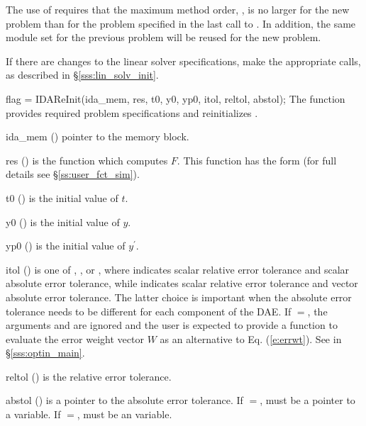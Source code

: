 {The use of  requires that the maximum method order,    
, is no larger for the new problem than for the problem  
specified in the last call to .  In addition, the same
{\nvector} module set for the previous problem
will be reused for the new problem.

If there are changes to the linear solver specifications, make the
appropriate  calls, as described in \S\ref{sss:lin_solv_init}.

{
  flag = IDAReInit(ida\_mem, res, t0, y0, yp0, itol, reltol, abstol);
}
{
  The function  provides required problem specifications 
  and reinitializes {\ida}.
}
{
  \begin{args}
  \item[ida\_mem] ()
    pointer to the {\ida} memory block.
  \item[res] ()
    is the {\C} function which computes $F$. This function has the form 
     (for full details see \S\ref{ss:user_fct_sim}).
  \item[t0] ()
    is the initial value of $t$.
  \item[y0] ()
    is the initial value of $y$. 
  \item[yp0] ()
    is the initial value of $y^\prime$.   
  \item[itol] () 
    is one of , , or , where 
    indicates scalar relative error tolerance and scalar absolute error tolerance, 
    while  indicates scalar relative error tolerance and vector 
    absolute error tolerance.  The latter choice is important when the absolute 
    error tolerance needs to be different for each component of the DAE.  If
    $=$, the arguments  and  are ignored
    and the user is expected to provide a function to evaluate the error weight
    vector $W$ as an alternative to Eq. (\ref{e:errwt}).
    See  in \S\ref{sss:optin_main}.
  \item[reltol] ()
    is the relative error tolerance.
  \item[abstol] ()
    is a pointer to the absolute error tolerance. If $=$,
     must be a pointer to a  variable. If
   $=$,  must be an  variable.
  \end{args}
}}
